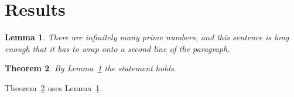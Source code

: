\documentclass{article}
\newtheorem{theorem}{Theorem}[section]
\newtheorem{lemma}[theorem]{Lemma}
\begin{document}
\section{Results}
\begin{lemma}\label{lem:a}
There are infinitely many prime numbers, and this sentence is long enough that it has to wrap onto a second line of the paragraph.
\end{lemma}
\begin{theorem}\label{thm:b}
By Lemma~\ref{lem:a} the statement holds.
\end{theorem}
Theorem~\ref{thm:b} uses Lemma~\ref{lem:a}.
\end{document}
